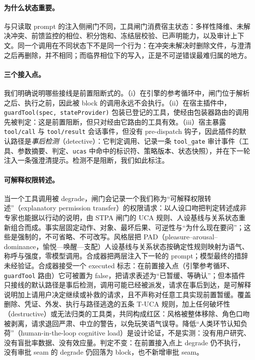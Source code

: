 \paragraph{为什么状态重要。} 与只读取 prompt 的注入侧闸门不同，工具闸门消费宿主状态：多样性降维、未解决冲突、前馈监控的相位、积分饱和、冻结层校验、已声明能力，以及审计上下文。同一个调用在不同状态下不是同一个行为：在冲突未解决时删除文件，与澄清之后再删除，并不相同；而临界相位下的写入，正是不可逆错误最难归属的地方。

\paragraph{三个接入点。} 我们明确说明哪些接线是前置阻断式的。（i）在引擎的参考循环中，闸门位于解析之后、执行之前，因此被 block 的调用永远不会执行。（ii）在宿主插件中，\texttt{guardTool(spec, stateProvider)} 包装已登记的工具，使经由包装器路由的调用先被判定：这是前置阻断，但只对经由它路由的工具有效。（iii）宿主暴露 \texttt{tool/call} 与 \texttt{tool/result} 会话事件，但没有 pre-dispatch 钩子，因此插件的默认路径是\emph{事后检测}（detective）：它判定调用、记录一条 \texttt{tool\_gate} 审计事件（工具、参数摘要、判定、\texttt{ucas} 中命中的标识符、策略版本、状态快照），并在下一轮注入一条强澄清提示。检测不是阻断，我们如此标注。

\paragraph{可解释权限转述。} 当一个工具调用被 degrade，闸门会记录一个我们称为“可解释权限转述”（explanatory permission transfer）的权限请求：以人设口吻把判定转述成非专家也能据以行动的说明，由 STPA 闸门的 UCA 规则、人设基线与关系状态重新组合而成。事实层固定动作、对象、最坏后果、可逆性与“为什么现在要问”；这些是强制的，不可省略、不可改写。风格层把 PAD（pleasure--arousal--dominance，愉悦—唤醒—支配）人设基线与关系状态按确定性规则映射为语气、称呼与强度，零模型调用。合成器把两层注入下一轮的 prompt；模型最终的措辞未经验证。合成器接受一个 executed 标志：在前置接入点（引擎参考循环、\texttt{guardTool} 路由）它可被置为 false，把请求表述为“已暂缓、等确认”；但本插件只接线的默认路径是事后检测，调用可能已经被派发，请求在事后到达，是可解释说明加上请用户决定继续或补救的请求，且不声称对任意工具实现前置暂缓。覆盖删除、凭证、外发、执行与路径逃逸的五条 T-UCA 规则，加上任何破坏性（destructive）或无法归类的工具类，共同构成红区：风格被整体移除、角色口吻被剥离，请求退回严肃、中立的警告，以免玩笑语气误导。降低“人类环节认知负荷”（human-in-the-loop cognitive load）是设计论证，不是实测：没有用户研究、没有盲批率数据、没有效应量。判定不变：在前置接入点上 degrade 仍不执行，没有审批 seam 的 degrade 仍回落为 block，也不新增审批 seam。

